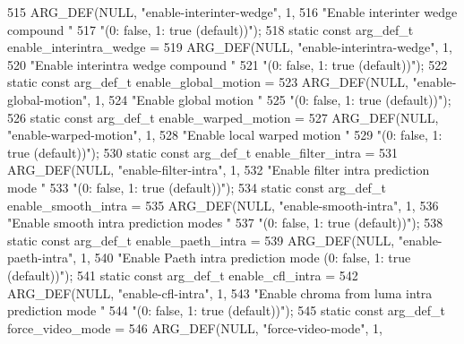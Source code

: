 \begin{DoxyCodeInclude}
{{{{{{{515     ARG\_DEF(NULL, \textcolor{stringliteral}{"enable-interinter-wedge"}, 1,
516             \textcolor{stringliteral}{"Enable interinter wedge compound "}
517             \textcolor{stringliteral}{"(0: false, 1: true (default))"});
518 \textcolor{keyword}{static} \textcolor{keyword}{const} arg\_def\_t enable\_interintra\_wedge =
519     ARG\_DEF(NULL, \textcolor{stringliteral}{"enable-interintra-wedge"}, 1,
520             \textcolor{stringliteral}{"Enable interintra wedge compound "}
521             \textcolor{stringliteral}{"(0: false, 1: true (default))"});
522 \textcolor{keyword}{static} \textcolor{keyword}{const} arg\_def\_t enable\_global\_motion =
523     ARG\_DEF(NULL, \textcolor{stringliteral}{"enable-global-motion"}, 1,
524             \textcolor{stringliteral}{"Enable global motion "}
525             \textcolor{stringliteral}{"(0: false, 1: true (default))"});
526 \textcolor{keyword}{static} \textcolor{keyword}{const} arg\_def\_t enable\_warped\_motion =
527     ARG\_DEF(NULL, \textcolor{stringliteral}{"enable-warped-motion"}, 1,
528             \textcolor{stringliteral}{"Enable local warped motion "}
529             \textcolor{stringliteral}{"(0: false, 1: true (default))"});
530 \textcolor{keyword}{static} \textcolor{keyword}{const} arg\_def\_t enable\_filter\_intra =
531     ARG\_DEF(NULL, \textcolor{stringliteral}{"enable-filter-intra"}, 1,
532             \textcolor{stringliteral}{"Enable filter intra prediction mode "}
533             \textcolor{stringliteral}{"(0: false, 1: true (default))"});
534 \textcolor{keyword}{static} \textcolor{keyword}{const} arg\_def\_t enable\_smooth\_intra =
535     ARG\_DEF(NULL, \textcolor{stringliteral}{"enable-smooth-intra"}, 1,
536             \textcolor{stringliteral}{"Enable smooth intra prediction modes "}
537             \textcolor{stringliteral}{"(0: false, 1: true (default))"});
538 \textcolor{keyword}{static} \textcolor{keyword}{const} arg\_def\_t enable\_paeth\_intra =
539     ARG\_DEF(NULL, \textcolor{stringliteral}{"enable-paeth-intra"}, 1,
540             \textcolor{stringliteral}{"Enable Paeth intra prediction mode (0: false, 1: true (default))"});
541 \textcolor{keyword}{static} \textcolor{keyword}{const} arg\_def\_t enable\_cfl\_intra =
542     ARG\_DEF(NULL, \textcolor{stringliteral}{"enable-cfl-intra"}, 1,
543             \textcolor{stringliteral}{"Enable chroma from luma intra prediction mode "}
544             \textcolor{stringliteral}{"(0: false, 1: true (default))"});
545 \textcolor{keyword}{static} \textcolor{keyword}{const} arg\_def\_t force\_video\_mode =
546     ARG\_DEF(NULL, \textcolor{stringliteral}{"force-video-mode"}, 1,
}}}}}}}
\end{DoxyCodeInclude}

